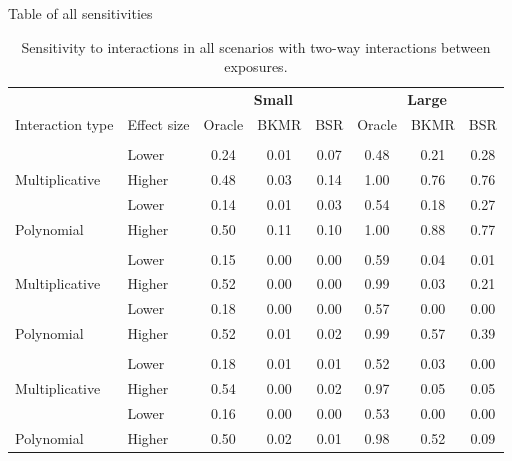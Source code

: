 \documentclass[12pt, twoside]{amherstthesis}
\begin{document}
Table of all sensitivities
\begin{table}

\caption{\label{tab:twowaytab}Sensitivity to interactions in all scenarios with two-way interactions between exposures.}
\centering
\begin{tabular}[t]{llcccccc}
\toprule
\multicolumn{2}{c}{\textbf{ }} & \multicolumn{3}{c}{\textbf{Small}} & \multicolumn{3}{c}{\textbf{Large}} \\
\cmidrule(l{3pt}r{3pt}){3-5} \cmidrule(l{3pt}r{3pt}){6-8}
Interaction type & Effect size & Oracle & BKMR & BSR & Oracle & BKMR & BSR\\
\midrule
\addlinespace[0.3em]
\multicolumn{8}{l}{\textbf{Hg-Ni}}\\
 & Lower & 0.24 & 0.01 & 0.07 & 0.48 & 0.21 & 0.28\\

\multirow{-2}{*}{\raggedright\arraybackslash \hspace{1em}Multiplicative} & Higher & 0.48 & 0.03 & 0.14 & 1.00 & 0.76 & 0.76\\
\addlinespace
 & Lower & 0.14 & 0.01 & 0.03 & 0.54 & 0.18 & 0.27\\

\multirow{-2}{*}{\raggedright\arraybackslash \hspace{1em}Polynomial} & Higher & 0.50 & 0.11 & 0.10 & 1.00 & 0.88 & 0.77\\
\addlinespace
\addlinespace[0.3em]
\multicolumn{8}{l}{\textbf{Cd-As}}\\
 & Lower & 0.15 & 0.00 & 0.00 & 0.59 & 0.04 & 0.01\\

\multirow{-2}{*}{\raggedright\arraybackslash \hspace{1em}Multiplicative} & Higher & 0.52 & 0.00 & 0.00 & 0.99 & 0.03 & 0.21\\
\addlinespace
 & Lower & 0.18 & 0.00 & 0.00 & 0.57 & 0.00 & 0.00\\

\multirow{-2}{*}{\raggedright\arraybackslash \hspace{1em}Polynomial} & Higher & 0.52 & 0.01 & 0.02 & 0.99 & 0.57 & 0.39\\
\addlinespace
\addlinespace[0.3em]
\multicolumn{8}{l}{\textbf{Ni-Co}}\\
 & Lower & 0.18 & 0.01 & 0.01 & 0.52 & 0.03 & 0.00\\

\multirow{-2}{*}{\raggedright\arraybackslash \hspace{1em}Multiplicative} & Higher & 0.54 & 0.00 & 0.02 & 0.97 & 0.05 & 0.05\\
\addlinespace
 & Lower & 0.16 & 0.00 & 0.00 & 0.53 & 0.00 & 0.00\\

\multirow{-2}{*}{\raggedright\arraybackslash \hspace{1em}Polynomial} & Higher & 0.50 & 0.02 & 0.01 & 0.98 & 0.52 & 0.09\\
\bottomrule
\end{tabular}
\end{table}
\end{document}
